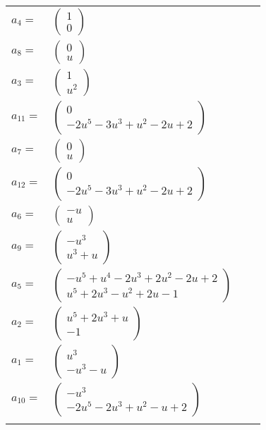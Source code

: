 \documentclass[1p]{elsarticle_modified}
\theoremstyle{definition}
\begin{document}
\begin{tabular}{m{7pt} m{180pt} m{7pt} m{180pt} }
\flushright $a_{4}=$&$\begin{pmatrix}1\\0\end{pmatrix}$ \\
\flushright $a_{8}=$&$\begin{pmatrix}0\\u\end{pmatrix}$ \\
\flushright $a_{3}=$&$\begin{pmatrix}1\\u^2\end{pmatrix}$ \\
\flushright $a_{11}=$&$\begin{pmatrix}0\\-2 u^5-3 u^3+u^2-2 u+2\end{pmatrix}$ \\
\flushright $a_{7}=$&$\begin{pmatrix}0\\u\end{pmatrix}$ \\
\flushright $a_{12}=$&$\begin{pmatrix}0\\-2 u^5-3 u^3+u^2-2 u+2\end{pmatrix}$ \\
\flushright $a_{6}=$&$\begin{pmatrix}- u\\u\end{pmatrix}$ \\
\flushright $a_{9}=$&$\begin{pmatrix}- u^3\\u^3+u\end{pmatrix}$ \\
\flushright $a_{5}=$&$\begin{pmatrix}- u^5+u^4-2 u^3+2 u^2-2 u+2\\u^5+2 u^3- u^2+2 u-1\end{pmatrix}$ \\
\flushright $a_{2}=$&$\begin{pmatrix}u^5+2 u^3+u\\-1\end{pmatrix}$ \\
\flushright $a_{1}=$&$\begin{pmatrix}u^3\\- u^3- u\end{pmatrix}$ \\
\flushright $a_{10}=$&$\begin{pmatrix}- u^3\\-2 u^5-2 u^3+u^2- u+2\end{pmatrix}$\\&\end{tabular}
\end{document}
